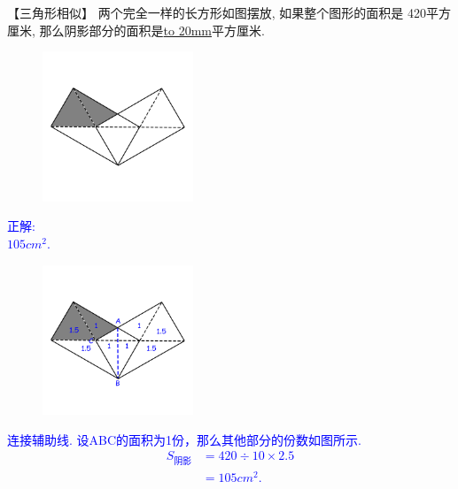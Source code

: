 \item {
    【三角形相似】
    两个完全一样的长方形如图摆放, 如果整个图形的面积是 420平方厘米, 那么阴影部分的面积是\underline{\hbox to 20mm{}}平方厘米.
    \begin{figure}[H]
        \centering
        \includegraphics[width=0.4\textwidth]{./pics/Chapter_2/5.png}
    \end{figure}
    \ifshowSolution 
        \fangsong{}\textcolor{blue}{
            正解: \\
            $105 {cm}^2$. 
            \begin{figure}[H]
                \centering
                \includegraphics[width=0.4\textwidth]{./pics/Chapter_2/seikai_5.png}
            \end{figure}
            连接辅助线. 设ABC的面积为1份，那么其他部分的份数如图所示.\\
            \begin{align*}
                S_{阴影} &= 420\div 10 \times 2.5 \\
                &= 105 {cm}^2.
            \end{align*}
        }
    \else
        \vspace{1cm}
    \fi
}

